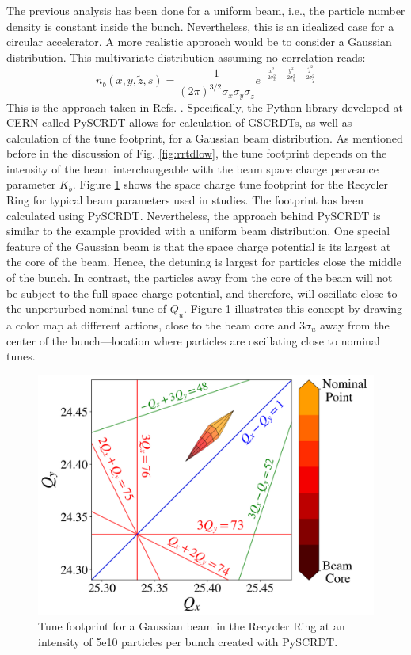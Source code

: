 The previous analysis has been done for a uniform beam, i.e., the particle number density is constant inside the bunch. Nevertheless, this is an idealized case for a circular accelerator. A more realistic approach would be to consider a Gaussian distribution. This multivariate distribution assuming no correlation reads:
\begin{equation}
    \label{eq:distgaussian}
    n_b(x,y,\tilde{z},s) = \frac{1}{\left(2 \pi \right)^{3/2} \sigma_x \sigma_y \sigma_{\tilde{z}}}e^{-\frac{x^2}{2 \sigma_x^2}-\frac{y^2}{2 \sigma_y^2}-\frac{\tilde{z}^2}{2 \sigma_{\tilde{z}}^2}}
\end{equation}
This is the approach taken in Refs. \cite{pyscrdt, scrdt_report}. Specifically, the Python library developed at CERN called PySCRDT \cite{pyscrdt} allows for calculation of GSCRDTs, as well as calculation of the tune footprint, for a Gaussian beam distribution. As mentioned before in the discussion of Fig. \ref{fig:rrtdlow}, the tune footprint depends on the intensity of the beam interchangeable with the beam space charge perveance parameter $K_b$. Figure \ref{fig:rrtdmid} shows the space charge tune footprint for the Recycler Ring for typical beam parameters used in studies. The footprint has been calculated using PySCRDT. Nevertheless, the approach behind PySCRDT is similar to the example provided with a uniform beam distribution. One special feature of the Gaussian beam is that the space charge potential is its largest at the core of the beam. Hence, the detuning is largest for particles close the middle of the bunch. In contrast, the particles away from the core of the beam will not be subject to the full space charge potential, and therefore, will oscillate close to the unperturbed nominal tune of $Q_u$. Figure \ref{fig:rrtdmid} illustrates this concept by drawing a color map at different actions, close to the beam core and $3\sigma_u$ away from the center of the bunch---location where particles are oscillating close to nominal tunes.         

\begin{figure}[H]
    \centering
    \includegraphics[width=\columnwidth]{chapter2/rrtdmid.png}
    \caption{Tune footprint for a Gaussian beam in the Recycler Ring at an intensity of 5e10 particles per bunch created with PySCRDT.}
    \label{fig:rrtdmid}
 \end{figure}

